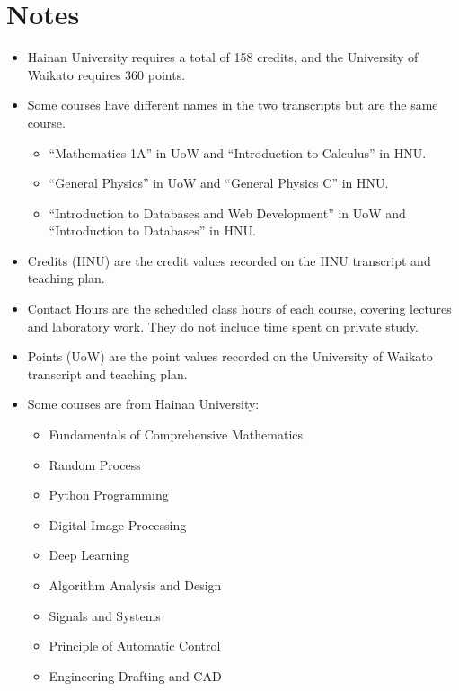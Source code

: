 \documentclass{article}
\begin{document}
\section*{Notes}
\begin{itemize}
    \item Hainan University requires a total of 158 credits, and the University of Waikato requires 360 points.
    \item Some courses have different names in the two transcripts but are the same course.
        \begin{itemize}
            \item ``Mathematics 1A'' in UoW and ``Introduction to Calculus'' in HNU.
            \item ``General Physics'' in UoW and ``General Physics C'' in HNU.
            \item ``Introduction to Databases and Web Development'' in UoW and ``Introduction to Databases'' in HNU.
        \end{itemize} 
    \item Credits (HNU) are the credit values recorded on the HNU transcript and teaching plan.
    \item Contact Hours are the scheduled class hours of each course, covering lectures and laboratory work. They do not include time spent on private study.
    \item Points (UoW) are the point values recorded on the University of Waikato transcript and teaching plan.
    \item Some courses are from Hainan University: 
        \begin{itemize}
            \item Fundamentals of Comprehensive Mathematics
            \item Random Process
            \item Python Programming
            \item Digital Image Processing
            \item Deep Learning
            \item Algorithm Analysis and Design
            \item Signals and Systems
            \item Principle of Automatic Control
            \item Engineering Drafting and CAD
        \end{itemize}
\end{itemize}

\clearpage
\end{document}
